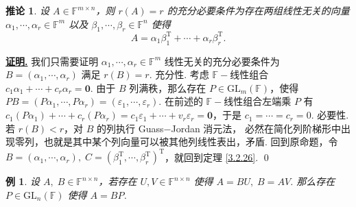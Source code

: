 \documentclass[10pt,openany]{article}
\theoremstyle{thmstyle} %
\theoremstyle{defstyle} %
\newtheorem{corollary}[theorem]{推论}
\theoremstyle{prostyle} %
\theoremstyle{exastyle}
\newtheorem{example}[theorem]{例}
\theoremstyle{remstyle}
\renewenvironment{proof}[1][证明]{\par\underline{\textbf{#1.}} \;\fangsong}{\qed\par}
\newcommand{\T}{^{\text{T}}}
\newcommand{\F}{\mathbb{F}}
\newcommand{\gfn}{\text{GL}_n(\mathbb{F})}
\newcommand{\gfm}{\text{GL}_m(\mathbb{F})}
\newcommand{\n}{^{n \times n}}
\newcommand{\mn}{^{m \times n}}
\begin{document}
\begin{corollary}
	设 \( A \in \F\mn \)，则 \( r(A)=r \) 的充分必要条件为存在两组线性无关的向量 \( \alpha_1,\cdots,\alpha_r \in \F^m \) 以及 \( \beta_1,\cdots,\beta_r \in \F^n \) 使得 
	\[ A=\alpha_1\beta_1\T+\cdots+\alpha_r \beta_r\T. \]
\end{corollary}

\begin{proof}
	我们只需要证明 \( \alpha_1,\cdots,\alpha_r \in \F^m \) 线性无关的充分必要条件为 \( B=(\alpha_1,\cdots,\alpha_r) \) 满足 \( r(B)=r \). 充分性. 考虑 \( \F-\)线性组合 \( c_1\alpha_1+\cdots+c_r\alpha_r=\bm{0} \). 由于 \( B \) 列满秩，那么存在 \( P \in \gfm \)，使得 \( PB=(P\alpha_1,\cdots,P\alpha_r)=(\varepsilon_1,\cdots,\varepsilon_r) \). 在前述的 \( \F-\)线性组合左端乘 \( P \) 有 \( c_1(P\alpha_1)+\cdots+c_r(P\alpha_r)=c_1\varepsilon_1+\cdots+v_r\varepsilon_r=\bm{0} \)，于是 \( c_1=\cdots=c_r=0 \). 必要性. 若 \( r(B)<r \)，对 \( B \) 的列执行 Guass\(-\)Jordan 消元法， 必然在简化列阶梯形中出现零列，也就是其中某个列向量可以被其他列线性表出，矛盾. 回到原命题，令 \( B=(\alpha_1,\cdots,\alpha_r), \; C=(\beta_1\T,\cdots,\beta_r\T)\T \)，就回到定理 \ref{3.2.26}.
\end{proof}

\begin{example} 
	设 \( A, \; B \in \F\n \)，若存在 \( U,V \in \F\n \) 使得 \( A=BU, \; B=AV \). 那么存在 \( P \in \gfn \) 使得 \( A=BP \).
\end{example}
\end{document}
